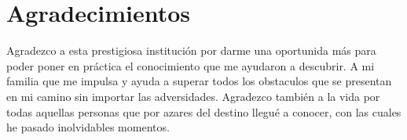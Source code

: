 \chapter{Agradecimientos}

Agradezco a esta prestigiosa institución por darme una oportunida más para poder poner en práctica el conocimiento que me ayudaron a descubrir. A mi familia que me impulsa y ayuda a superar todos los obstaculos que se presentan en mi camino sin importar las adversidades. Agradezco también a la vida por todas aquellas personas que por azares del destino llegué a conocer, con las cuales he pasado inolvidables momentos.\\